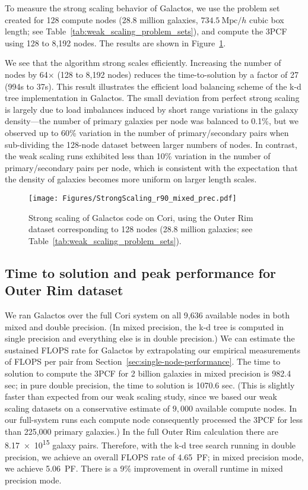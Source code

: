 To measure the strong scaling behavior of Galactos, we use the problem set created for 128 compute nodes (28.8 million galaxies, $734.5~\text{Mpc}/h$ cubic box length; see Table~\ref{tab:weak_scaling_problem_sets}), and compute the 3PCF using 128 to 8,192 nodes.
The results are shown in Figure~\ref{fig:strong-scaling}.

We see that the algorithm strong scales efficiently.
Increasing the number of nodes by 64$\times$ (128 to 8,192 nodes) reduces the time-to-solution by a factor of 27 (994s to 37s).
This result illustrates the efficient load balancing scheme of the k-d tree implementation in Galactos. 
The small deviation from perfect strong scaling is largely due to load imbalances induced by short range variations in the galaxy density---the number of primary galaxies per node was balanced to 0.1\%, but we observed up to 60\% variation in the number of primary/secondary pairs when sub-dividing the 128-node dataset between larger numbers of nodes.
In contrast, the weak scaling runs exhibited less than 10\% variation in the number of primary/secondary pairs per node, which is consistent with the expectation that the density of galaxies becomes more uniform on larger length scales.



\begin{figure}
\centering
\texttt{[image: Figures/StrongScaling\_r90\_mixed\_prec.pdf]}
    \caption{Strong scaling of Galactos code on Cori, using the Outer Rim dataset corresponding to 128 nodes (28.8 million galaxies; see Table~\ref{tab:weak_scaling_problem_sets}).}
\label{fig:strong-scaling}
\end{figure}


\subsection{Time to solution and peak performance for Outer Rim dataset}

We ran Galactos over the full Cori system on all 9,636 available nodes in both
mixed and double precision. (In mixed precision, the k-d tree is computed in
single precision and everything else is in double precision.) We can estimate
the sustained FLOPS rate for Galactos by extrapolating our empirical
measurements of FLOPS per pair from Section~\ref{sec:single-node-performance}.
The time to solution to compute the 3PCF for 2 billion galaxies in mixed
precision is 982.4 sec; in pure double precision, the time to solution is
1070.6 sec. (This is slightly faster than expected from our weak scaling study,
since we based our weak scaling datasets on a conservative estimate of $9,000$
available compute nodes. In our full-system runs each compute node consequently
processed the 3PCF for less than 225,000 primary galaxies.) In the full Outer
Rim calculation there are \num{8.17e15} galaxy pairs. Therefore, with the k-d
tree search running in double precision, we achieve an overall FLOPS rate of
4.65~PF; in mixed precision mode, we achieve 5.06~PF. There is a 9\%
improvement in overall runtime in mixed precision mode.

